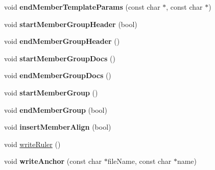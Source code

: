 \begin{DoxyCompactItemize}
\item 
\hypertarget{class_latex_generator_ab9823a1d24c83284ff21781c8caa8487}{void {\bfseries end\-Member\-Template\-Params} (const char $\ast$, const char $\ast$)}\label{class_latex_generator_ab9823a1d24c83284ff21781c8caa8487}

\item 
\hypertarget{class_latex_generator_ab9d164d85715527cff385a3d599ccf7b}{void {\bfseries start\-Member\-Group\-Header} (bool)}\label{class_latex_generator_ab9d164d85715527cff385a3d599ccf7b}

\item 
\hypertarget{class_latex_generator_a7e1a44a13d8b22dc7929a9cdbd94b725}{void {\bfseries end\-Member\-Group\-Header} ()}\label{class_latex_generator_a7e1a44a13d8b22dc7929a9cdbd94b725}

\item 
\hypertarget{class_latex_generator_aa8c7357f48d452ccd00a331623c4674a}{void {\bfseries start\-Member\-Group\-Docs} ()}\label{class_latex_generator_aa8c7357f48d452ccd00a331623c4674a}

\item 
\hypertarget{class_latex_generator_a0e63ff5117b5bd3305323117412c6ff1}{void {\bfseries end\-Member\-Group\-Docs} ()}\label{class_latex_generator_a0e63ff5117b5bd3305323117412c6ff1}

\item 
\hypertarget{class_latex_generator_a00a5eb19d218888ab778e3a2805f78a6}{void {\bfseries start\-Member\-Group} ()}\label{class_latex_generator_a00a5eb19d218888ab778e3a2805f78a6}

\item 
\hypertarget{class_latex_generator_af7073e7872d1d67efd015ff1855c8b02}{void {\bfseries end\-Member\-Group} (bool)}\label{class_latex_generator_af7073e7872d1d67efd015ff1855c8b02}

\item 
\hypertarget{class_latex_generator_a77394a193203024cb6dc72bea70ab195}{void {\bfseries insert\-Member\-Align} (bool)}\label{class_latex_generator_a77394a193203024cb6dc72bea70ab195}

\item 
void \hyperlink{class_latex_generator_a9fd641c75c5b5ee59a974c3b476584c2}{write\-Ruler} ()
\item 
\hypertarget{class_latex_generator_ad10e211d7701ea029222192f10efdf8e}{void {\bfseries write\-Anchor} (const char $\ast$file\-Name, const char $\ast$name)}\label{class_latex_generator_ad10e211d7701ea029222192f10efdf8e}


\end{DoxyCompactItemize}
